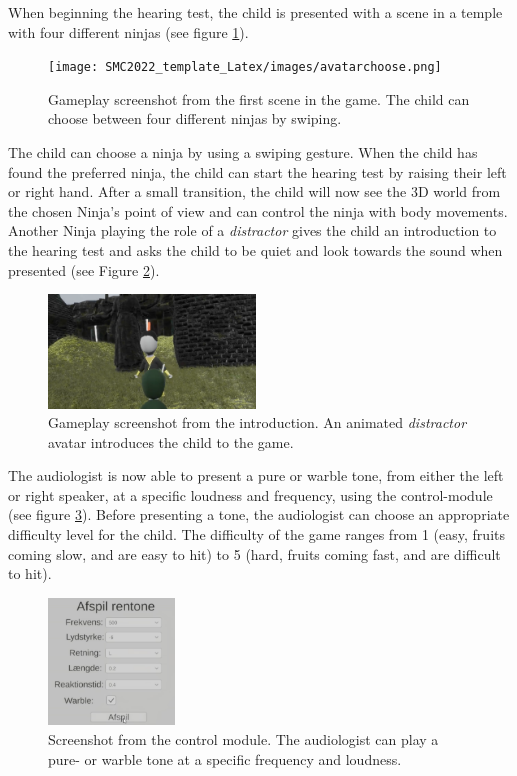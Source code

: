 When beginning the hearing test, the child is presented with a scene in a temple with four different ninjas (see figure \ref{fig:ninjaAvatar}). 

\begin{figure}[h]
    \centering   \texttt{[image: SMC2022\_template\_Latex/images/avatarchoose.png]}
    \caption{Gameplay screenshot from the first scene in the game. The child can choose between four different ninjas by swiping.}
    \label{fig:ninjaAvatar}
\end{figure}

The child can choose a ninja by using a swiping gesture. When the child has found the preferred ninja, the child can start the hearing test by raising their left or right hand. After a small transition, the child will now see the 3D world from the chosen Ninja's point of view and can control the ninja with body movements. Another Ninja playing the role of a \textit{distractor} gives the child an introduction to the hearing test and asks the child to be quiet and look towards the sound when presented (see Figure \ref{fig:distractor}).

\begin{figure}[h]
    \centering   \includegraphics[width = 0.49\textwidth]{SMC2022_template_Latex/images/distractor.png}
    \caption{Gameplay screenshot from the introduction. An animated \textit{distractor} avatar introduces the child to the game.}
    \label{fig:distractor}
\end{figure}

The audiologist is now able to present a pure or warble tone, from either the left or right speaker, at a specific loudness and frequency, using the control-module (see figure \ref{fig:controlModule}). Before presenting a tone, the audiologist can choose an appropriate difficulty level for the child. The difficulty of the game ranges from 1 (easy, fruits coming slow, and are easy to hit) to 5 (hard, fruits coming fast, and are difficult to hit). 

\begin{figure}[h]
    \centering   \includegraphics[width = 0.3\textwidth]{SMC2022_template_Latex/images/playtone.png}
    \caption{Screenshot from the control module. The audiologist can play a pure- or warble tone at a specific frequency and loudness.}
    \label{fig:controlModule}
\end{figure}

